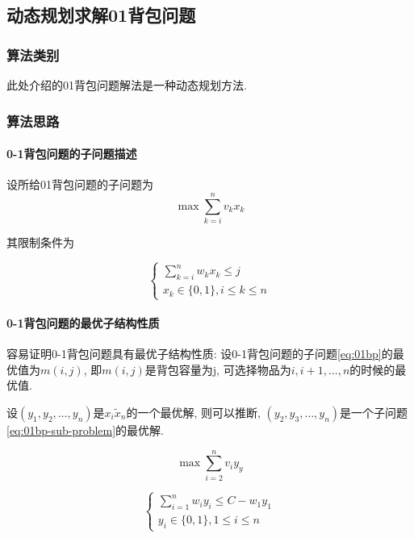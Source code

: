 \subsection{动态规划求解01背包问题}
\subsubsection{算法类别}
此处介绍的01背包问题解法是一种动态规划方法.

\subsubsection{算法思路}
\paragraph{0-1背包问题的子问题描述}

设所给01背包问题的子问题为
\begin{equation}
	\max \sum^n_{k=i}{v_k x_k}
	\label{eq:01bp}
\end{equation}

其限制条件为

\begin{equation}
	\left\{
	\begin{array}{rl}
		\sum^n_{k=i}{w_kx_k\leq j} \\
		x_k\in \{0,1\}, i\leq k\leq n
	\end{array}
	\right.
	\label{eq:01bp-limit}
\end{equation}

\paragraph{0-1背包问题的最优子结构性质}
容易证明0-1背包问题具有最优子结构性质:
设0-1背包问题的子问题\ref{eq:01bp}的最优值为$m(i, j)$, 即$m(i, j)$是背包容量为j,
可选择物品为$i, i+1, \dots, n$的时候的最优值.\par

设$(y_1, y_2, \dots, y_n)$是$x_i \tilde x_n$的一个最优解, 则可以推断, $(y_2,
	y_3, \dots, y_n)$是一个子问题\ref{eq:01bp-sub-problem}的最优解.\par

\begin{equation}
	\max \sum^n_{i=2}{v_i y_y}
	\label{eq:01bp-sub-problem-1}
\end{equation}

\begin{equation}
	\left \{
	\begin{array}{rl}
		\sum^n_{i=1}w_i y_i \leq C-w_1y_1 \\
		y_i \in \{0,1\}, 1\leq i \leq n
	\end{array}
	\right.
	\label{eq:01bp-sub-problem}
\end{equation}

